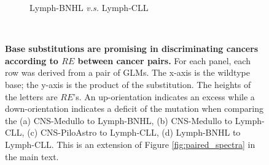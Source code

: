 \begin{figure}[ht!]
\begin{subfigure}{.5\textwidth}
    \caption{Lymph-BNHL \textit{v.s.} Lymph-CLL}
    \label{fig:spectra_bnhl_cll}
    \end{subfigure} \\
    \vspace{0.5cm}
    \caption{\textbf{Base substitutions are promising in discriminating cancers according to $RE$ between cancer pairs.} For each panel, each row was derived from a pair of GLMs. The x-axis is the wildtype base; the y-axis is the product of the substitution. The heights of the letters are $RE$'s. An up-orientation indicates an excess while a down-orientation indicates a deficit of the mutation when comparing the (a) CNS-Medullo to Lymph-BNHL, (b) CNS-Medullo to Lymph-CLL, (c) CNS-PiloAstro to Lymph-CLL, (d) Lymph-BNHL to Lymph-CLL. This is an extension of Figure \ref{fig:paired_spectra} in the main text.}
    \label{fig:apdx_paired_spectra}
\end{figure}